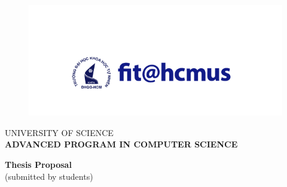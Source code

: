 \documentclass[14pt]{extarticle}
\begin{document}
    \thispagestyle{empty}
    
    
    
    \begin{minipage}{0.3\textwidth}
    \begin{figure}[H]
    \hspace{-2.5cm}
     \includegraphics[scale = 0.3]{logo.png}
    \end{figure}
    \end{minipage} \hfill
    \begin{minipage}{0.65\textwidth}
    \begin{center}
    \vspace{1cm}
    \small UNIVERSITY OF SCIENCE\\ \textbf{ADVANCED PROGRAM IN COMPUTER SCIENCE}
    \end{center}
    \end{minipage}

    \vspace{1cm}
    \begin{center}
        
        \textbf{\LARGE Thesis Proposal} \\ \vspace{.5cm} {\large (submitted by students)} 
    \end{center}
    
\end{document}
